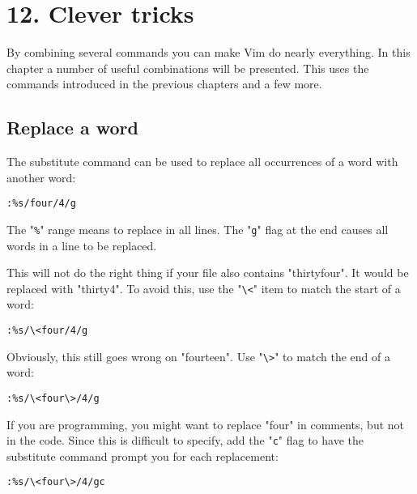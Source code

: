 \section{12. Clever tricks}
By combining several commands you can make Vim do nearly everything.  In this
chapter a number of useful combinations will be presented.  This uses the
commands introduced in the previous chapters and a few more.
\localtableofcontents
\subsection{Replace a word}
The substitute command can be used to replace all occurrences of a word with another word:

\begin{Verbatim}[samepage=true]
 :%s/four/4/g
\end{Verbatim}

The "\texttt{\%}" range means to replace in all lines.
The "\texttt{g}" flag at the end causes all words in a line to be replaced.

This will not do the right thing if your file also contains "thirtyfour".
It would be replaced with "thirty4".
To avoid this, use the "\texttt{\textbackslash{}<}" item to match the start of a word:

\begin{Verbatim}[samepage=true]
 :%s/\<four/4/g
\end{Verbatim}

Obviously, this still goes wrong on "fourteen".  Use "\texttt{\textbackslash{}>}" to match the end of
a word:

\begin{Verbatim}[samepage=true]
 :%s/\<four\>/4/g
\end{Verbatim}

If you are programming, you might want to replace "four" in comments, but not in the code.
Since this is difficult to specify, add the "\texttt{c}" flag to have the substitute command prompt you for each replacement:

\begin{Verbatim}[samepage=true]
 :%s/\<four\>/4/gc
\end{Verbatim}

